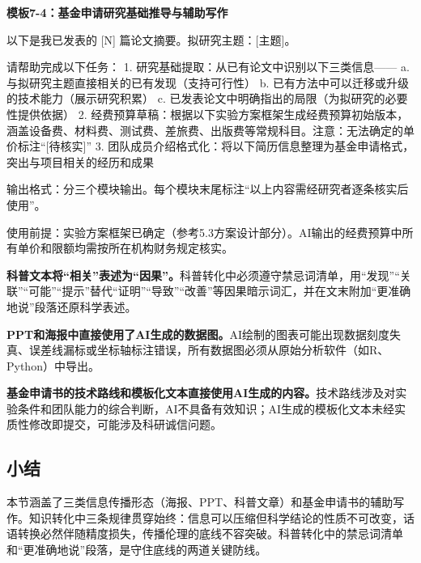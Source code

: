 \textbf{模板7-4：基金申请研究基础推导与辅助写作}

\begin{tcolorbox}[promptbox]
以下是我已发表的 [N] 篇论文摘要。拟研究主题：[主题]。

请帮助完成以下任务：
1. 研究基础提取：从已有论文中识别以下三类信息——
   a. 与拟研究主题直接相关的已有发现（支持可行性）
   b. 已有方法中可以迁移或升级的技术能力（展示研究积累）
   c. 已发表论文中明确指出的局限（为拟研究的必要性提供依据）
2. 经费预算草稿：根据以下实验方案框架生成经费预算初始版本，涵盖设备费、材料费、测试费、差旅费、出版费等常规科目。注意：无法确定的单价标注``[待核实]''
3. 团队成员介绍格式化：将以下简历信息整理为基金申请格式，突出与项目相关的经历和成果

输出格式：分三个模块输出。每个模块末尾标注``以上内容需经研究者逐条核实后使用''。
\end{tcolorbox}

使用前提：实验方案框架已确定（参考5.3方案设计部分）。AI输出的经费预算中所有单价和限额均需按所在机构财务规定核实。



\begin{mistakebox}

\textbf{科普文本将``相关''表述为``因果''。}科普转化中必须遵守禁忌词清单，用``发现''``关联''``可能''``提示''替代``证明''``导致''``改善''等因果暗示词汇，并在文末附加``更准确地说''段落还原科学表述。

\smallskip

\textbf{PPT和海报中直接使用了AI生成的数据图。}AI绘制的图表可能出现数据刻度失真、误差线漏标或坐标轴标注错误，所有数据图必须从原始分析软件（如R、Python）中导出。

\smallskip

\textbf{基金申请书的技术路线和模板化文本直接使用AI生成的内容。}技术路线涉及对实验条件和团队能力的综合判断，AI不具备有效知识；AI生成的模板化文本未经实质性修改即提交，可能涉及科研诚信问题。

\end{mistakebox}

\subsection*{小结}
本节涵盖了三类信息传播形态（海报、PPT、科普文章）和基金申请书的辅助写作。知识转化中三条规律贯穿始终：信息可以压缩但科学结论的性质不可改变，话语转换必然伴随精度损失，传播伦理的底线不容突破。科普转化中的禁忌词清单和``更准确地说''段落，是守住底线的两道关键防线。

